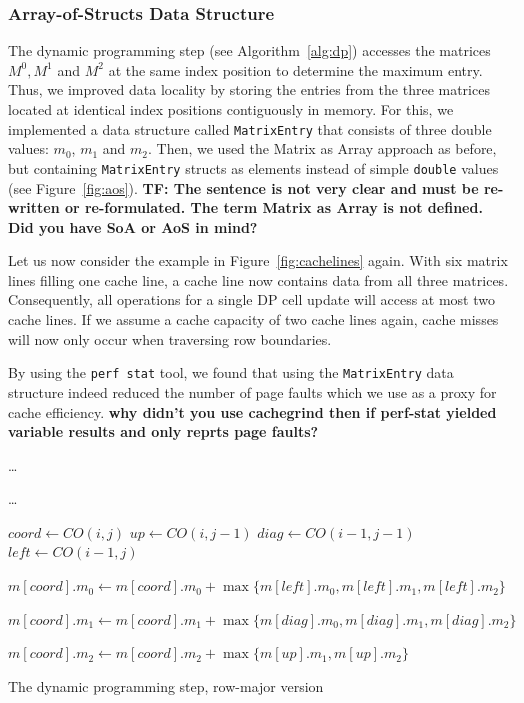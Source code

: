 \documentclass[runningheads,a4paper]{llncs}
\begin{document}
\subsubsection{Array-of-Structs Data Structure}
The dynamic programming step (see Algorithm~\ref{alg:dp}) accesses the matrices $M^0, M^1$ and $M^2$ at the same index position to determine the maximum entry. 
Thus, we improved data locality by storing the entries from the three matrices located at identical index positions contiguously in memory. 
For this, we implemented a data structure called \texttt{MatrixEntry} that consists of three double values: \texttt{$m_0$}, \texttt{$m_1$} and \texttt{$m_2$}. 
Then, we used the Matrix as Array approach as before, but containing \texttt{MatrixEntry} structs as elements instead of simple 
\texttt{double} values (see Figure~\ref{fig:aos}). \textbf{TF: The sentence is not very clear and must be re-written or re-formulated. The term Matrix as Array is not defined. Did you have SoA or AoS in mind?}

Let us now consider the example in Figure~\ref{fig:cachelines} again. 
With six matrix lines filling one cache line, a cache line now contains data from all three matrices. 
Consequently, all operations for a single DP cell update 
will access at most two cache lines. 
If we assume a cache capacity of two cache lines again, cache misses will now only occur when traversing row boundaries.

By using the \texttt{perf stat} tool, we found that using the \texttt{MatrixEntry} data structure indeed reduced 
the number of page faults which we use as a proxy for cache efficiency. 
{\bf why didn't you use cachegrind then if perf-stat yielded variable results and only reprts page faults?}


\begin{algorithm}

\ldots{}
 {
	 {
		\ldots{}
		
		$coord \gets CO(i, j)$\;	
		$up \gets CO(i, j-1)$\;
		$diag \gets CO(i-1, j-1)$\;		
		$left \gets CO(i-1, j)$\;
		
		$m[coord].m_0 \gets m[coord].m_0 + \max\{m[left].m_0, m[left].m_1, m[left].m_2\}$\;
		
		$m[coord].m_1 \gets m[coord].m_1 + \max\{m[diag].m_0, m[diag].m_1, m[diag].m_2\}$\;
		
		$m[coord].m_2 \gets m[coord].m_2 + \max\{m[up].m_1, m[up].m_2\}$\;
	}
}

\caption{The dynamic programming step, row-major version}
\label{alg:dp}
\end{algorithm}
\end{document}
